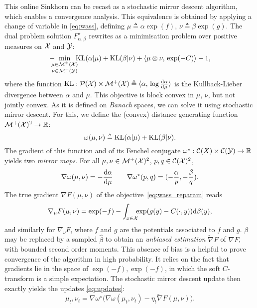 This online Sinkhorn can be recast as a stochastic mirror descent algorithm, which enables a convergence analysis.
%
This equivalence is obtained by applying a change
of variable in \eqref{eq:wass}, defining $\mu \triangleq \alpha \exp(f)$, $\nu
\triangleq \beta \exp(g)$. The dual problem solution $F_{\alpha, \beta}^\star$
rewrites as a minimisation problem over positive measures on $\mathcal{X}$ and $\mathcal{Y}$:
\begin{equation}\label{eq:wass_reparam}
    - \!\!\!\!\min_{\substack{\mu \in \mathcal{M}^+(\mathcal{X}) \\ 
    \nu \in \mathcal{M}^+(\mathcal{Y})}} \!\!\!\textrm{KL}(\alpha | \mu)
    + \textrm{KL}(\beta | \nu) + \langle \mu \otimes \nu,\,\exp(-C)\rangle - 1,
\end{equation}
where the function $\textrm{KL}: \mathcal{P}(\mathcal{X}) \times \mathcal{M}^+(\mathcal{X}) \triangleq \langle \alpha,\,
    \log \frac{\textrm{d} \alpha}{\textrm{d} \mu}\rangle$ is the Kullback-Lieber divergence between
$\alpha$ and $\mu$. This objective is block convex in $\mu$, $\nu$, but not jointly convex. As it is defined on \textit{Banach} spaces, we can solve it using stochastic mirror descent. For this, we define the (convex) distance generating function $\mathcal{M}^+(\mathcal{X})^2 \to \mathbb{R}$:
\begin{equation}
    \omega(\mu, \nu) \triangleq \textrm{KL}(\alpha | \mu) + \textrm{KL}(\beta | \nu).
\end{equation}
The gradient of this function and of its Fenchel conjugate $\omega^\star: \mathcal{C}(X)
\times \mathcal{C}(\mathcal{Y}) \to \mathbb{R}$ yields two \textit{mirror maps}. For all $\mu, \nu \in
\mathcal{M}^+(\mathcal{X})^2$, $p, q \in \mathcal{C}(\mathcal{X})^2$,
\begin{equation}
    \nabla \omega(\mu, \nu) = - \frac{\textrm{d} \alpha}{\textrm{d} \mu}
    \qquad \nabla \omega^\star(p, q) = (-\frac{\alpha}{p}, -\frac{\beta}{q}).
\end{equation}
The true gradient $\nabla F(\mu, \nu)$ of the objective~\eqref{eq:wass_reparam} reads
\begin{equation}
    \nabla_\mu F(\mu, \nu) = \exp(-f) - 
    \int_{x \in \mathcal{X}} \!\!\! \exp(g(y) - C(\cdot, y))\textrm{d} \beta(y),
\end{equation}
and similarly for $\nabla_\nu F$, where $f$ and $g$ are the potentials associated
to $f$ and $g$. $\beta$ may be replaced by a sampled $\hat \beta$ to obtain an
\textit{unbiased estimation} $\tilde \nabla F$ of $\nabla F$, with bounded second order moments.
This absence of bias is a helpful to prove convergence of the algorithm in high
probability. It relies on the fact that gradients lie in the space of $\exp(-f),
\exp(-f)$, in which the soft $C$-transform is a simple expectation. The stochastic
mirror descent update then exactly yields the updates \eqref{eq:updates}:
% 
\begin{equation}
    \mu_t, \nu_t = \nabla \omega^\star\Big( \nabla \omega(\mu_t, \nu_t) - 
    \eta_t \tilde \nabla F(\mu, \nu)\Big).
\end{equation}

